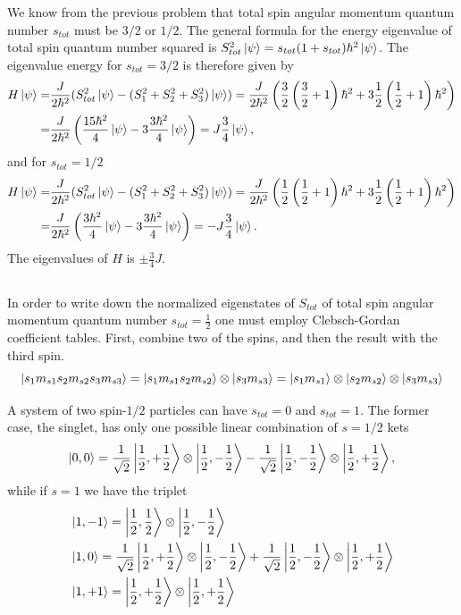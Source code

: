\documentclass{article}
\begin{document}
We know from the previous problem that total spin angular momentum quantum number $s_{tot}$ must be $3/2$ or $1/2$. The general formula for the energy eigenvalue of total spin quantum number squared is $S^2_{tot}\ket{\psi}=s_{tot}(1+s_{tot})\hbar^2\ket{\psi}$. The eigenvalue energy for $s_{tot}=3/2$ is therefore given by
\begin{align*}
H\ket{\psi} =& \frac{J}{2\hbar^2}(S_{tot}^2\ket{\psi}-(S_1^2+S_2^2+S_3^2)\ket{\psi})=\frac{J}{2\hbar^2}\left(\frac{3}{2}\left(\frac{3}{2}+1\right)\hbar^2 +3\frac{1}{2}\left(\frac{1}{2}+1\right)\hbar^2\right)\\
=&\frac{J}{2\hbar^2}\left(\frac{15\hbar^2}{4}\ket{\psi} -3\frac{3\hbar^2}{4}\ket{\psi} \right) = J\frac{3}{4}\ket{\psi},
\end{align*}
and for $s_{tot}=1/2$
\begin{align*}
H\ket{\psi} =& \frac{J}{2\hbar^2}(S_{tot}^2\ket{\psi}-(S_1^2+S_2^2+S_3^2)\ket{\psi})=\frac{J}{2\hbar^2}\left(\frac{1}{2}\left(\frac{1}{2}+1\right)\hbar^2 +3\frac{1}{2}\left(\frac{1}{2}+1\right)\hbar^2\right)\\
=&\frac{J}{2\hbar^2}\left(\frac{3\hbar^2}{4}\ket{\psi} -3\frac{3\hbar^2}{4}\ket{\psi} \right) = -J\frac{3}{4}\ket{\psi}.
\end{align*}
The eigenvalues of $H$ is $\pm\frac{3}{4}J$.

\subsection{}
In order to write down the normalized eigenstates of $S_{tot}$ of total spin angular momentum quantum number $s_{tot}=\frac{1}{2}$ one must employ Clebsch-Gordan coefficient tables. First, combine two of the spins, and then the result with the third spin.
\begin{equation*}
\ket{s_1m_{s1}s_2m_{s2}s_3m_{s3}}=\ket{s_1m_{s1}s_2m_{s2}}\otimes\ket{s_3m_{s3}}=\ket{s_1m_{s1}}\otimes\ket{s_2m_{s2}}\otimes\ket{s_3m_{s3}}
\end{equation*}

A system of two spin-$1/2$ particles can have $s_{tot}=0$ and $s_{tot}=1$. The former case, the singlet, has only one possible linear combination of $s=1/2$ kets
\begin{equation}
\label{eq:spins0}
\ket{0,0}=\frac{1}{\sqrt{2}}\ket{\frac{1}{2},+\frac{1}{2}}\otimes\ket{\frac{1}{2},-\frac{1}{2}}-\frac{1}{\sqrt{2}}\ket{\frac{1}{2},-\frac{1}{2}}\otimes\ket{\frac{1}{2},+\frac{1}{2}},
\end{equation}
while if $s=1$ we have the triplet
\begin{align}
\label{eq:spins1-1}
&\ket{1,-1} = \ket{\frac{1}{2},\frac{1}{2}}\otimes\ket{\frac{1}{2},-\frac{1}{2}} \\
\label{eq:spins10}
&\ket{1, 0} = \frac{1}{\sqrt{2}}\ket{\frac{1}{2},+\frac{1}{2}}\otimes\ket{\frac{1}{2},-\frac{1}{2}} + \frac{1}{\sqrt{2}}\ket{\frac{1}{2},-\frac{1}{2}}\otimes\ket{\frac{1}{2},+\frac{1}{2}} \\
\label{eq:spins1+1}
&\ket{1,+1} = \ket{\frac{1}{2},+\frac{1}{2}}\otimes\ket{\frac{1}{2},+\frac{1}{2}}
\end{align}
\end{document}
